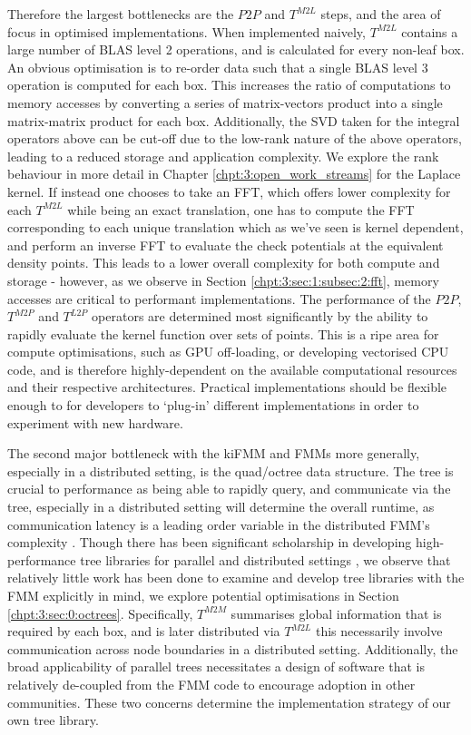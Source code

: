 Therefore the largest bottlenecks are the $P2P$ and $T^{M2L}$ steps, and the area of focus in optimised implementations. When implemented naively, $T^{M2L}$ contains a large number of BLAS level 2 operations, and is calculated for every non-leaf box. An obvious optimisation is to re-order data such that a single BLAS level 3 operation is computed for each box. This increases the ratio of computations to memory accesses by converting a series of matrix-vectors product into a single matrix-matrix product for each box. Additionally, the SVD taken for the integral operators above can be cut-off due to the low-rank nature of the above operators, leading to a reduced storage and application complexity. We explore the rank behaviour in more detail in Chapter \ref{chpt:3:open_work_streams} for the Laplace kernel. If instead one chooses to take an FFT, which offers lower complexity for each $T^{M2L}$ while being an exact translation, one has to compute the FFT corresponding to each unique translation which as we've seen is kernel dependent, and perform an inverse FFT to evaluate the check potentials at the equivalent density points. This leads to a lower overall complexity for both compute and storage - however, as we observe in Section \ref{chpt:3:sec:1:subsec:2:fft}, memory accesses are critical to performant implementations. The performance of the $P2P$, $T^{M2P}$ and $T^{L2P}$ operators are determined most significantly by the ability to rapidly evaluate the kernel function over sets of points. This is a ripe area for compute optimisations, such as GPU off-loading, or developing vectorised CPU code, and is therefore highly-dependent on the available computational resources and their respective architectures. Practical implementations should be flexible enough to for developers to `plug-in' different implementations in order to experiment with new hardware.

The second major bottleneck with the kiFMM and FMMs more generally, especially in a distributed setting, is the quad/octree data structure. The tree is crucial to performance as being able to rapidly query, and communicate via the tree, especially in a distributed setting will determine the overall runtime, as communication latency is a leading order variable in the distributed FMM's complexity \cite{Yokota2014}. Though there has been significant scholarship in developing high-performance tree libraries for parallel and distributed settings \cite{BursteddeWilcoxGhattas11,sundar2008bottom,sundar2013hyksort}, we observe that relatively little work has been done to examine and develop tree libraries with the FMM explicitly in mind, we explore potential optimisations in Section \ref{chpt:3:sec:0:octrees}. Specifically, $T^{M2M}$ summarises global information that is required by each box, and is later distributed via $T^{M2L}$ this necessarily involve communication across node boundaries in a distributed setting. Additionally, the broad applicability of parallel trees necessitates a design of software that is relatively de-coupled from the FMM code to encourage adoption in other communities. These two concerns determine the implementation strategy of our own tree library.

